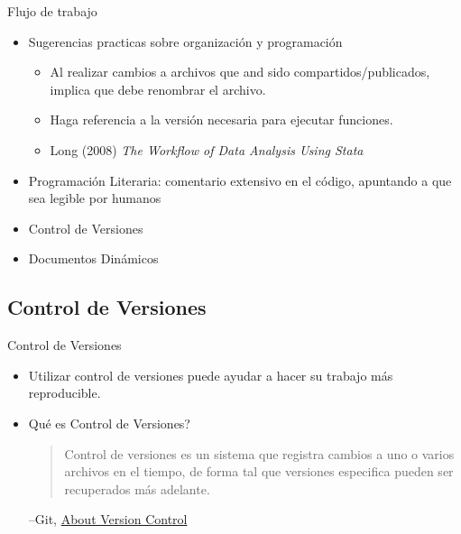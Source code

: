 \documentclass{beamer}
\begin{document}
\begin{frame}{Flujo de trabajo}

 \begin{itemize}
 \item Sugerencias practicas sobre organización y programación
 \begin{itemize}[<.->]
 	\item Al realizar cambios a archivos que and sido compartidos/publicados, implica que debe renombrar el archivo.
 	\item Haga referencia a la versión necesaria para ejecutar funciones.
 	\item Long (2008) \textit{The Workflow of Data Analysis Using Stata}
  \end{itemize}
 \item Programación Literaria: comentario extensivo en el código, apuntando a que sea legible por humanos
 \item Control de Versiones
 \item Documentos Dinámicos
\end{itemize}
\end{frame}

\subsection*{Control de Versiones}
\begin{frame}{Control de Versiones}
\begin{itemize}[<.->]
\item
Utilizar control de versiones puede ayudar a hacer su trabajo más reproducible.

\item
Qué es Control de Versiones?

\begin{quote}
Control de versiones es un sistema que registra cambios a uno o varios archivos en el tiempo, de forma tal que versiones especifica pueden ser recuperados más adelante.
\end{quote}
--Git, \href{https://git-scm.com/book/en/v2/Getting-Started-About-Version-Control}{About Version Control}
\end{itemize}
\end{frame}
\end{document}
